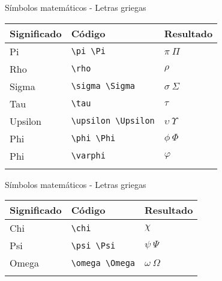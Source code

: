 \documentclass[
  ignorenonframetext,
]{beamer}
\begin{document}
\begin{frame}[fragile]{Símbolos matemáticos - Letras griegas}
\label{suxedmbolos-matemuxe1ticos---letras-griegas-2}
\begin{longtable}[]{@{}lll@{}}
\toprule\noalign{}
Significado & Código & Resultado \\
\midrule\noalign{}
\endhead
Pi & \texttt{\textbackslash{}pi\ \textbackslash{}Pi} & \(\pi\ \Pi\) \\
Rho & \texttt{\textbackslash{}rho} & \(\rho\) \\
Sigma & \texttt{\textbackslash{}sigma\ \textbackslash{}Sigma} &
\(\sigma\ \Sigma\) \\
Tau & \texttt{\textbackslash{}tau} & \(\tau\) \\
Upsilon & \texttt{\textbackslash{}upsilon\ \textbackslash{}Upsilon} &
\(\upsilon\ \Upsilon\) \\
Phi & \texttt{\textbackslash{}phi\ \textbackslash{}Phi} &
\(\phi\ \Phi\) \\
Phi & \texttt{\textbackslash{}varphi} & \(\varphi\) \\
\bottomrule\noalign{}
\end{longtable}
\end{frame}

\begin{frame}[fragile]{Símbolos matemáticos - Letras griegas}
\label{suxedmbolos-matemuxe1ticos---letras-griegas-3}
\begin{longtable}[]{@{}lll@{}}
\toprule\noalign{}
Significado & Código & Resultado \\
\midrule\noalign{}
\endhead
Chi & \texttt{\textbackslash{}chi} & \(\chi\) \\
Psi & \texttt{\textbackslash{}psi\ \textbackslash{}Psi} &
\(\psi\ \Psi\) \\
Omega & \texttt{\textbackslash{}omega\ \textbackslash{}Omega} &
\(\omega\ \Omega\) \\
\bottomrule\noalign{}
\end{longtable}
\end{frame}
\end{document}
